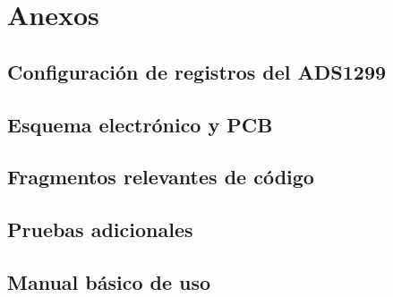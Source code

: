 \documentclass[../main.tex]{subfiles}
\begin{document}
\section{Anexos}

\subsection{Configuración de registros del ADS1299}


\subsection{Esquema electrónico y PCB}


\subsection{Fragmentos relevantes de código}


\subsection{Pruebas adicionales}


\subsection{Manual básico de uso}

\end{document}
